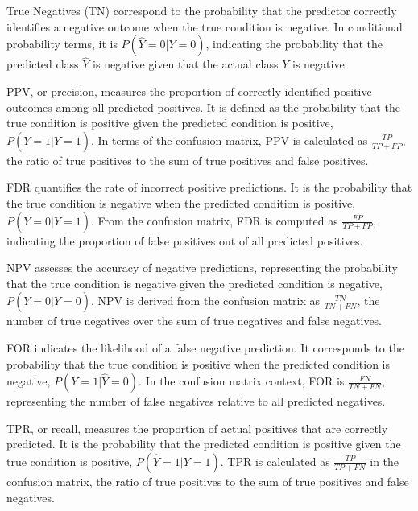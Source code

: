 True Negatives (TN) correspond to the probability that the predictor correctly identifies a negative outcome when the true condition is negative. In conditional probability terms, it is $P(\hat{Y}=0|Y=0)$, indicating the probability that the predicted class $\hat{Y}$ is negative given that the actual class $Y$ is negative.

\begin{definition}\label{def:ppv}
PPV, or precision, measures the proportion of correctly identified positive outcomes among all predicted positives. It is defined as the probability that the true condition is positive given the predicted condition is positive, $P(Y=1|\hat{Y}=1)$. In terms of the confusion matrix, PPV is calculated as $\frac{TP}{TP + FP}$, the ratio of true positives to the sum of true positives and false positives.
\end{definition}

\begin{definition}\label{def:fdr}
FDR quantifies the rate of incorrect positive predictions. It is the probability that the true condition is negative when the predicted condition is positive, $P(Y=0|\hat{Y}=1)$. From the confusion matrix, FDR is computed as $\frac{FP}{TP + FP}$, indicating the proportion of false positives out of all predicted positives.
\end{definition}

\begin{definition}\label{def:npv}
NPV assesses the accuracy of negative predictions, representing the probability that the true condition is negative given the predicted condition is negative, $P(Y=0|\hat{Y}=0)$. NPV is derived from the confusion matrix as $\frac{TN}{TN + FN}$, the number of true negatives over the sum of true negatives and false negatives.
\end{definition}

\begin{definition}\label{def:for}
FOR indicates the likelihood of a false negative prediction. It corresponds to the probability that the true condition is positive when the predicted condition is negative, $P(Y=1|\hat{Y}=0)$. In the confusion matrix context, FOR is $\frac{FN}{TN + FN}$, representing the number of false negatives relative to all predicted negatives.
\end{definition}

\begin{definition}\label{def:tpr}
TPR, or recall, measures the proportion of actual positives that are correctly predicted. It is the probability that the predicted condition is positive given the true condition is positive, $P(\hat{Y}=1|Y=1)$. TPR is calculated as $\frac{TP}{TP + FN}$ in the confusion matrix, the ratio of true positives to the sum of true positives and false negatives.
\end{definition}

